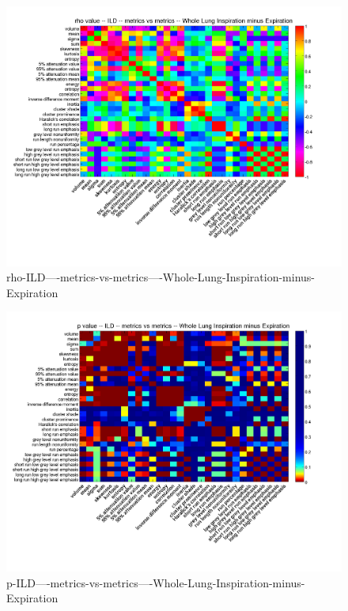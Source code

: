 \documentclass[12pt]{article}
\begin{document}
\begin{figure}
    \includegraphics[width=0.84\linewidth,viewport=100 60 620 550]{corr/rho-ILD----metrics-vs-metrics----Whole-Lung-Inspiration-minus-Expiration.png}
    \caption{rho-ILD----metrics-vs-metrics----Whole-Lung-Inspiration-minus-Expiration}
    \label{fig:rho-ILD----metrics-vs-metrics----Whole-Lung-Inspiration-minus-Expiration}
\end{figure}
\begin{figure}
    \includegraphics[width=0.84\linewidth,viewport=100 60 620 550]{corr/p-ILD----metrics-vs-metrics----Whole-Lung-Inspiration-minus-Expiration.png}
    \caption{p-ILD----metrics-vs-metrics----Whole-Lung-Inspiration-minus-Expiration}
    \label{fig:p-ILD----metrics-vs-metrics----Whole-Lung-Inspiration-minus-Expiration}
\end{figure}
\end{document}
